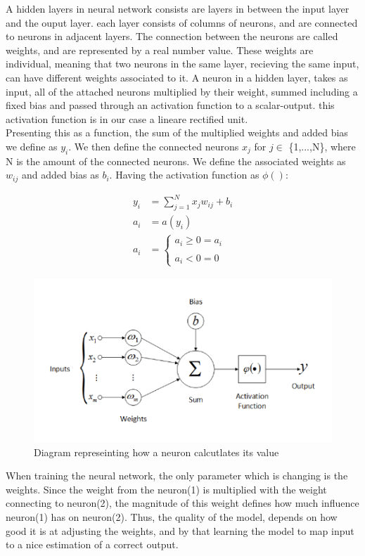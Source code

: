 
A hidden layers in neural network consists are layers in between the input layer and the ouput layer. each layer consists of columns of neurons, and are connected to neurons in adjacent layers. The connection between the neurons are called weights, and are represented by a real number value. These weights are individual, meaning that two neurons in the same layer, recieving the same input, can have different weights associated to it. A neuron in a hidden layer, takes as input, all of the attached neurons multiplied by their weight, summed including a fixed bias and passed through an activation function to a scalar-output. this activation function is in our case a lineare rectified unit.\\

\noindent
Presenting this as a function, the sum of the multiplied weights and added bias we define as $y_i$. We then define the connected neurons $x_j$ for $j \in$ \{1,...,N\}, where N is the amount of the connected neurons. We define the associated weights as $w_{ij}$ and added bias as $b_i$. Having the activation function as $\phi()$:

\begin{align}
	y_i &= \sum^N_{j=1} x_jw_{ij} + b_i\\
	a_i &= a(y_i) \\
	a_i &=\left\{ \begin{matrix}
		a_i \geq 0 = a_i \\
		\\
		a_i < 0 = 0
	\end{matrix}
	\right.
\end{align}


\begin{figure}[!ht]
  \centering
  \includegraphics[scale=1.0]{latex/IMGs/neuronFunc.png}
  \caption{Diagram represeinting how a neuron calcutlates its value}\label{Baseline:before}
\end{figure}

\noindent
When training the neural network, the only parameter which is changing is the weights. Since the weight from the neuron(1) is multiplied with the weight connecting to neuron(2), the magnitude of this weight defines how much influence neuron(1) has on neuron(2). Thus, the quality of the model, depends on how good it is at adjusting the weights, and by that learning the model to map input to a nice estimation of a correct output.
